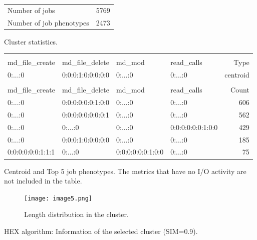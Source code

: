 \documentclass{jhps}
\begin{document}
\begin{cluster}
	\begin{subtable}{\textwidth}
		\centering
		\begin{tabular}{ll}
			\centering
			Number of jobs & 5769 \\
			Number of job phenotypes & 2473 \\
		\end{tabular}
		\caption{Cluster statistics.}
		\label{cluster:hex_lev:stats}
	\end{subtable}
	\medskip
	\begin{subtable}{\textwidth}
		\centering
		\begin{tiny}
			\begin{tabular}{llll|r}
				\rowcolor{tblhead}
				\multicolumn{4}{l|}{Hexadecimal coding} & \\
				\rowcolor{tblhead}
				md\_file\_create  & md\_file\_delete  & md\_mod           & read\_calls       & Type     \\
				\hline
				0:...:0           & 0:0:0:1:0:0:0:0:0 & 0:...:0           & 0:...:0           & centroid \\
				\multicolumn{5}{l}{}\\
				\rowcolor{tblhead}
				md\_file\_create  & md\_file\_delete  & md\_mod           & read\_calls       & Count    \\
				\hline
				0:...:0           & 0:0:0:0:0:0:1:0:0 & 0:...:0           & 0:...:0           & 606      \\
				0:...:0           & 0:0:0:0:0:0:0:0:1 & 0:...:0           & 0:...:0           & 562      \\
				0:...:0           & 0:...:0           & 0:...:0           & 0:0:0:0:0:0:1:0:0 & 429      \\
				0:...:0           & 0:0:0:1:0:0:0:0:0 & 0:...:0           & 0:...:0           & 185      \\
				0:0:0:0:0:0:1:1:1 & 0:...:0           & 0:0:0:0:0:0:1:0:0 & 0:...:0           & 75       \\
			\end{tabular}
		\end{tiny}
		\caption{Centroid and Top 5 job phenotypes. The metrics that have no I/O activity are not included in the table.}
		\label{cluster:hex_lev:top_jobs}
	\end{subtable}
	\medskip
	\begin{subfigure}{\textwidth}
		\centering
		\texttt{[image: image5.png]}
		\caption{Length distribution in the cluster.}
		\label{cluster:hex_lev:length}
	\end{subfigure}
	\caption{HEX algorithm: Information of the selected cluster (SIM=0.9).}
	\label{cluster:hex_lev}
\end{cluster}
\end{document}
